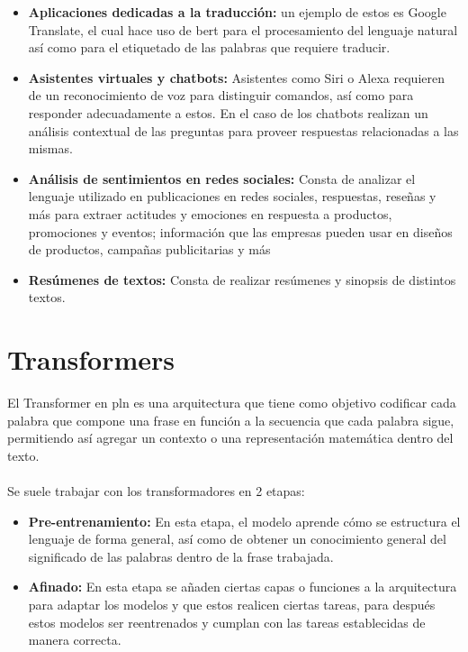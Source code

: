 \documentclass[12pt, a4paper, titlepage]{report}
\begin{document}
		    	\begin{itemize}
		    		\item \textbf{Aplicaciones dedicadas a la traducción: }un ejemplo de estos es Google Translate, el cual hace uso de \acrshort{bert} para el procesamiento del lenguaje natural así como para el etiquetado de las palabras que requiere traducir.
		    		\item \textbf{Asistentes virtuales y chatbots: }Asistentes como Siri o Alexa requieren de un reconocimiento de voz para distinguir comandos, así como para responder adecuadamente a estos. En el caso de los chatbots realizan un análisis contextual de las preguntas para proveer respuestas relacionadas a las mismas.
		    		\item \textbf{Análisis de sentimientos en redes sociales: }Consta de analizar el lenguaje utilizado en publicaciones en redes sociales, respuestas, reseñas y más para extraer actitudes y emociones en respuesta a productos, promociones y eventos; información que las empresas pueden usar en diseños de productos, campañas publicitarias y más
		    		\item \textbf{Resúmenes de textos: }Consta de realizar resúmenes y sinopsis de distintos textos.
		    	\end{itemize} 
        
        \section{Transformers}
        El Transformer en \acrfull{pln} es una arquitectura que tiene como objetivo codificar cada palabra que compone una frase en función a la secuencia que cada palabra sigue, permitiendo así agregar un contexto o una representación matemática dentro del texto.\\\\    
        Se suele trabajar con los transformadores en 2 etapas: 
        \begin{itemize}
        	\item \textbf{Pre-entrenamiento: }En esta etapa, el modelo aprende cómo se estructura el lenguaje de forma general, así como de obtener un conocimiento general del significado de las palabras dentro de la frase trabajada.\cite{refQueesuntransformer}
        	\item \textbf{Afinado: }En esta etapa se añaden ciertas capas o funciones a la arquitectura para adaptar los modelos y que estos realicen ciertas tareas, para después estos modelos ser reentrenados y cumplan con las tareas establecidas de manera correcta.\cite{refQueesuntransformer}
        \end{itemize}  
   
\end{document}
